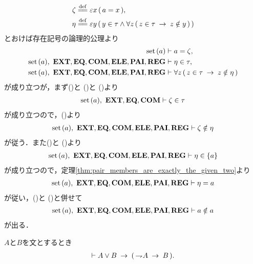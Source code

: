 \begin{sketch}
\begin{align}
			\zeta &\defeq \varepsilon x\, (\, a = x\, ), \\
			\eta &\defeq \varepsilon y\, (\, y \in \tau \wedge \forall z\, (\, 
			z \in \tau \rarrow z \notin y\, )\, )
		\end{align}
		とおけば存在記号の論理的公理より
		\begin{align}
			\operatorname*{set}\hspace{0.15em}(a) &\vdash a = \zeta, \label{fom:no_class_contains_itself_4} \\
			\operatorname*{set}\hspace{0.15em}(a),\ \mbox{{\bf EXT}},\mbox{{\bf EQ}},\mbox{\bf COM},\mbox{{\bf ELE}},\mbox{{\bf PAI}},\mbox{{\bf REG}} &\vdash 
			\eta \in \tau, \label{fom:no_class_contains_itself_5} \\
			\operatorname*{set}\hspace{0.15em}(a),\ \mbox{{\bf EXT}},\mbox{{\bf EQ}},\mbox{\bf COM},\mbox{{\bf ELE}},\mbox{{\bf PAI}},\mbox{{\bf REG}} &\vdash 
			\forall z\, (\, z \in \tau \hspace{0.25em}\rightarrow\hspace{0.25em} z \notin \eta\, )
			\label{fom:no_class_contains_itself_6}
		\end{align}
		が成り立つが，まず()と
		()と
		()より
		\begin{align}
			\operatorname*{set}\hspace{0.15em}(a),\ \mbox{{\bf EXT}},\mbox{{\bf EQ}},\mbox{\bf COM} \vdash \zeta \in \tau
		\end{align}
		が成り立つので，()より
		\begin{align}
			\operatorname*{set}\hspace{0.15em}(a),\ \mbox{{\bf EXT}},\mbox{{\bf EQ}},\mbox{\bf COM},\mbox{{\bf ELE}},\mbox{{\bf PAI}},\mbox{{\bf REG}} \vdash 
			\zeta \notin \eta
			\label{fom:no_class_contains_itself_7}
		\end{align}
		が従う．また()と
		()より
		\begin{align}
			\operatorname*{set}\hspace{0.15em}(a),\ \mbox{{\bf EXT}},\mbox{{\bf EQ}},\mbox{\bf COM},\mbox{{\bf ELE}},\mbox{{\bf PAI}},\mbox{{\bf REG}} \vdash \eta \in \{a\}
		\end{align}
		が成り立つので，定理\ref{thm:pair_members_are_exactly_the_given_two}より
		\begin{align}
			\operatorname*{set}\hspace{0.15em}(a),\ \mbox{{\bf EXT}},\mbox{{\bf EQ}},\mbox{\bf COM},\mbox{{\bf ELE}},\mbox{{\bf PAI}},\mbox{{\bf REG}} \vdash \eta = a
		\end{align}
		が従い，()と
		()と併せて
		\begin{align}
			\operatorname*{set}\hspace{0.15em}(a),\ \mbox{{\bf EXT}},\mbox{{\bf EQ}},\mbox{\bf COM},\mbox{{\bf ELE}},\mbox{{\bf PAI}},\mbox{{\bf REG}} \vdash a \notin a
		\end{align}
		が出る．
		\QED
	\end{sketch}
	
	\begin{screen}
		\begin{logicalthm}[選言三段論法]
		\label{logicalthm:disjunctive_syllogism}
			$A$と$B$を文とするとき
			\begin{align}
				\vdash A \vee B \hspace{0.25em}\rightarrow\hspace{0.25em} (\, \rightharpoondown\hspace{-0.25em} A \hspace{0.25em}\rightarrow\hspace{0.25em} B\, ).
			\end{align}
		\end{logicalthm}
	\end{screen}
	
